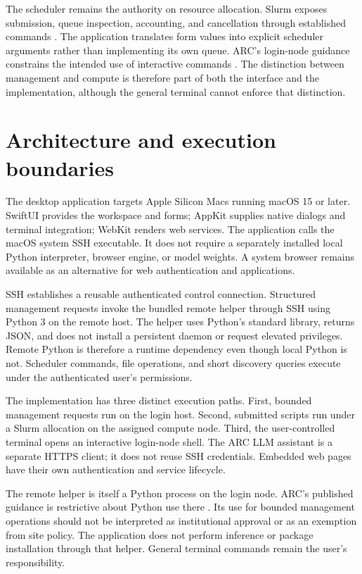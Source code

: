\documentclass[manuscript,screen,nonacm]{acmart}
\begin{document}
The scheduler remains the authority on resource allocation. Slurm exposes submission, queue inspection, accounting, and cancellation through established commands \cite{slurm}. The application translates form values into explicit scheduler arguments rather than implementing its own queue. ARC's login-node guidance constrains the intended use of interactive commands \cite{arcpolicy}. The distinction between management and compute is therefore part of both the interface and the implementation, although the general terminal cannot enforce that distinction.

\section{Architecture and execution boundaries}

The desktop application targets Apple Silicon Macs running macOS 15 or later. SwiftUI provides the workspace and forms; AppKit supplies native dialogs and terminal integration; WebKit renders web services. The application calls the macOS system SSH executable. It does not require a separately installed local Python interpreter, browser engine, or model weights. A system browser remains available as an alternative for web authentication and applications.

SSH establishes a reusable authenticated control connection. Structured management requests invoke the bundled remote helper through SSH using Python 3 on the remote host. The helper uses Python's standard library, returns JSON, and does not install a persistent daemon or request elevated privileges. Remote Python is therefore a runtime dependency even though local Python is not. Scheduler commands, file operations, and short discovery queries execute under the authenticated user's permissions.

The implementation has three distinct execution paths. First, bounded management requests run on the login host. Second, submitted scripts run under a Slurm allocation on the assigned compute node. Third, the user-controlled terminal opens an interactive login-node shell. The ARC LLM assistant is a separate HTTPS client; it does not reuse SSH credentials. Embedded web pages have their own authentication and service lifecycle.

The remote helper is itself a Python process on the login node. ARC's published guidance is restrictive about Python use there \cite{arcpolicy}. Its use for bounded management operations should not be interpreted as institutional approval or as an exemption from site policy. The application does not perform inference or package installation through that helper. General terminal commands remain the user's responsibility.
\end{document}
